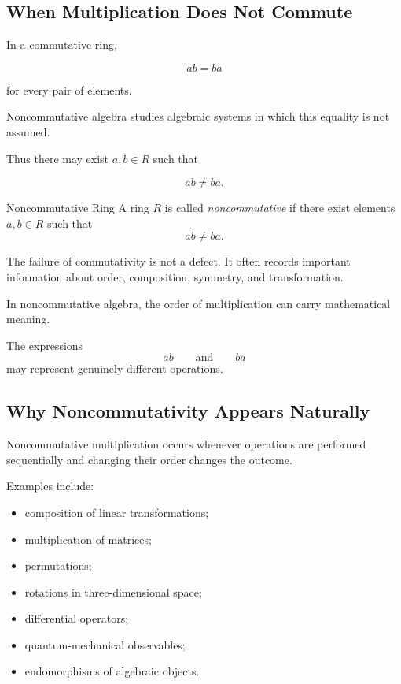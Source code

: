 \subsection{When Multiplication Does Not Commute}
\label{subsec:noncommutative-multiplication}

In a commutative ring,

\[ ab=ba \]

for every pair of elements.

Noncommutative algebra studies algebraic systems in which this equality is
not assumed.

Thus there may exist \(a,b\in R\) such that

\[ ab\neq ba. \]

\begin{definitionbox}{Noncommutative Ring}
A ring \(R\) is called \emph{noncommutative} if there exist elements
\(a,b\in R\) such that
\[ ab\neq ba. \]
\end{definitionbox}

The failure of commutativity is not a defect. It often records important
information about order, composition, symmetry, and transformation.

\begin{conceptbox}
In noncommutative algebra, the order of multiplication can carry
mathematical meaning.

The expressions
\[ ab\qquad\text{and}\qquad ba \]
may represent genuinely different operations.
\end{conceptbox}

\subsection{Why Noncommutativity Appears Naturally}
\label{subsec:why-noncommutativity}

Noncommutative multiplication occurs whenever operations are performed
sequentially and changing their order changes the outcome.

Examples include:

\begin{itemize}
    \item composition of linear transformations;
    \item multiplication of matrices;
    \item permutations;
    \item rotations in three-dimensional space;
    \item differential operators;
    \item quantum-mechanical observables;
    \item endomorphisms of algebraic objects.
\end{itemize}

